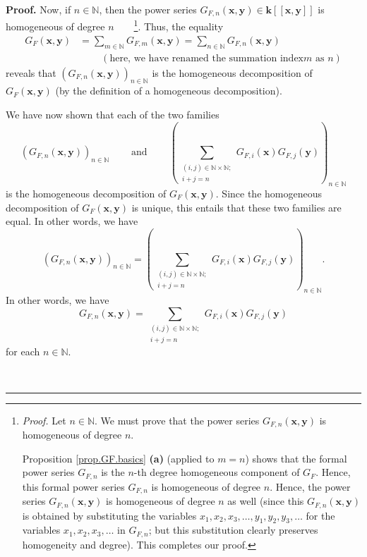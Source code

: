 \documentclass[numbers=enddot,12pt,final,onecolumn,notitlepage]{scrartcl}%
\theoremstyle{definition}
\newenvironment{proof}[1][Proof]{\noindent\textbf{#1.} }{\ \rule{0.5em}{0.5em}}
\let\sumnonlimits\sum
\renewcommand{\sum}{\sumnonlimits\limits}
\newenvironment{verlong}{}{}
\begin{document}
\begin{verlong}
\begin{proof}
Now, if $n\in\mathbb{N}$, then the power series $G_{F,n}\left(  \mathbf{x}%
,\mathbf{y}\right)  \in\mathbf{k}\left[  \left[  \mathbf{x},\mathbf{y}\right]
\right]  $ is homogeneous of degree $n$\ \ \ \ \footnote{\textit{Proof.} Let
$n\in\mathbb{N}$. We must prove that the power series $G_{F,n}\left(
\mathbf{x},\mathbf{y}\right)  $ is homogeneous of degree $n$.
\par
Proposition \ref{prop.GF.basics} \textbf{(a)} (applied to $m=n$) shows that
the formal power series $G_{F,n}$ is the $n$-th degree homogeneous component
of $G_{F}$. Hence, this formal power series $G_{F,n}$ is homogeneous of degree
$n$. Hence, the power series $G_{F,n}\left(  \mathbf{x},\mathbf{y}\right)  $
is homogeneous of degree $n$ as well (since this $G_{F,n}\left(
\mathbf{x},\mathbf{y}\right)  $ is obtained by substituting the variables
$x_{1},x_{2},x_{3},\ldots,y_{1},y_{2},y_{3},\ldots$ for the variables
$x_{1},x_{2},x_{3},\ldots$ in $G_{F,n}$; but this substitution clearly
preserves homogeneity and degree). This completes our proof.}. Thus, the
equality%
\begin{align*}
G_{F}\left(  \mathbf{x},\mathbf{y}\right)   &  =\sum_{m\in\mathbb{N}}%
G_{F,m}\left(  \mathbf{x},\mathbf{y}\right)  =\sum_{n\in\mathbb{N}}%
G_{F,n}\left(  \mathbf{x},\mathbf{y}\right) \\
&  \ \ \ \ \ \ \ \ \ \ \left(  \text{here, we have renamed the summation index
}m\text{ as }n\right)
\end{align*}
reveals that $\left(  G_{F,n}\left(  \mathbf{x},\mathbf{y}\right)  \right)
_{n\in\mathbb{N}}$ is the homogeneous decomposition of $G_{F}\left(
\mathbf{x},\mathbf{y}\right)  $ (by the definition of a homogeneous decomposition).

We have now shown that each of the two families
\[
\left(  G_{F,n}\left(  \mathbf{x},\mathbf{y}\right)  \right)  _{n\in
\mathbb{N}}\ \ \ \ \ \ \ \ \ \ \text{and}\ \ \ \ \ \ \ \ \ \ \left(
\sum_{\substack{\left(  i,j\right)  \in\mathbb{N}\times\mathbb{N}%
;\\i+j=n}}G_{F,i}\left(  \mathbf{x}\right)  G_{F,j}\left(  \mathbf{y}\right)
\right)  _{n\in\mathbb{N}}%
\]
is the homogeneous decomposition of $G_{F}\left(  \mathbf{x},\mathbf{y}%
\right)  $. Since the homogeneous decomposition of $G_{F}\left(
\mathbf{x},\mathbf{y}\right)  $ is unique, this entails that these two
families are equal. In other words, we have%
\[
\left(  G_{F,n}\left(  \mathbf{x},\mathbf{y}\right)  \right)  _{n\in
\mathbb{N}}=\left(  \sum_{\substack{\left(  i,j\right)  \in\mathbb{N}%
\times\mathbb{N};\\i+j=n}}G_{F,i}\left(  \mathbf{x}\right)  G_{F,j}\left(
\mathbf{y}\right)  \right)  _{n\in\mathbb{N}}.
\]
In other words, we have%
\begin{equation}
G_{F,n}\left(  \mathbf{x},\mathbf{y}\right)  =\sum_{\substack{\left(
i,j\right)  \in\mathbb{N}\times\mathbb{N};\\i+j=n}}G_{F,i}\left(
\mathbf{x}\right)  G_{F,j}\left(  \mathbf{y}\right)
\label{pf.thm.DeltaGFm.1xy.6}%
\end{equation}
for each $n\in\mathbb{N}$.


\end{proof}
\end{verlong}
\end{document}
